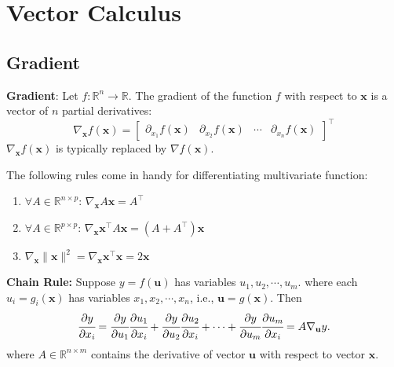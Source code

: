 \section{Vector Calculus}
    \subsection{Gradient}
    \begin{Def}
        \textbf{Gradient}: Let $f:\mathbb{R}^n\to \mathbb{R}$. The gradient of the function $f$ with respect to $\mathbf{x}$ is a vector of $n$ partial derivatives:
        \begin{equation}
            \nabla_{\mathbf{x}} f(\mathbf{x}) = \begin{bmatrix}
                \partial_{x_1}f(\mathbf{x}) & 
                \partial_{x_2}f(\mathbf{x}) & 
                \cdots &
                \partial_{x_n}f(\mathbf{x})
            \end{bmatrix}^{\top}
        \end{equation}
        $\nabla_{\mathbf{x}} f(\mathbf{x})$ is typically replaced by $\nabla f(\mathbf{x})$.
    \end{Def}
    \noindent The following rules come in handy for differentiating multivariate function:
    \begin{enumerate}
        \item  $\forall A \in\mathbb{R}^{n\times p}$: $\nabla_{\mathbf{x}} A\mathbf{x} = A^{\top}$
        \item $\forall A \in\mathbb{R}^{p\times p}$: $\nabla_{\mathbf{x}}\mathbf{x}^{\top}A \mathbf{x} = (A + A^{\top})\mathbf{x}$
        \item $\nabla_{\mathbf{x}}\lVert \mathbf{x} \rVert^2 = \nabla_{\mathbf{x}}\mathbf{x}^{\top}\mathbf{x} = 2\mathbf{x}$
    \end{enumerate}
    \begin{Thm}\label{Chain-rule}
        \textbf{Chain Rule:}
        Suppose $y = f(\mathbf{u})$ has variables $u_1, u_2, \cdots, u_m$. where each $u_i = g_i(\mathbf{x})$ has variables $x_1, x_2, \cdots, x_n$, i.e., $\mathbf{u} = g(\mathbf{x})$. Then
        \begin{equation}
            \cfrac{\partial y}{\partial x_i} = \cfrac{\partial y}{\partial u_1}\cfrac{\partial u_1}{\partial x_i} + \cfrac{\partial y}{\partial u_2}\cfrac{\partial u_2}{\partial x_i} + \cdots + \cfrac{\partial y}{\partial u_m}\cfrac{\partial u_m}{\partial x_i} = A\nabla_{\mathbf{u}} y.
        \end{equation}
        where $A \in\mathbb{R}^{n\times m}$ contains the derivative of vector $\mathbf{u}$ with respect to vector $\mathbf{x}$.
    \end{Thm}

